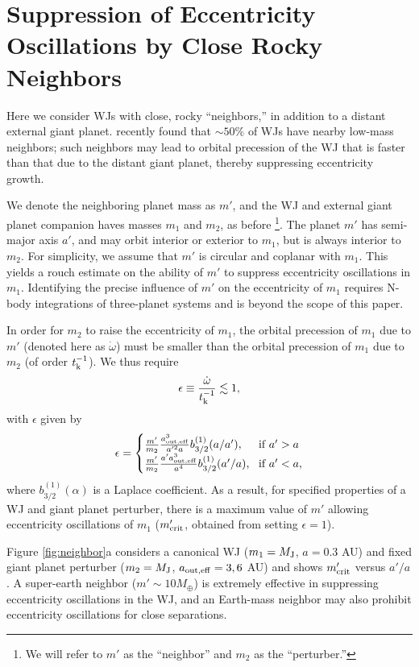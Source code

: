 \documentclass[12pt,useAMS, usenatbib]{mn2e}
\newcommand{\be}{\begin{equation}}
\newcommand{\ee}{\end{equation}}
\newcommand{\aouteff}{a_{\rm out,eff}}
\newcommand{\tk}{t_{\rm k}}
\newcommand{\mjup}{M_{\rm J}}
\begin{document}
\section{Suppression of Eccentricity Oscillations by Close Rocky Neighbors}
Here we consider WJs with close, rocky ``neighbors,'' in addition to a distant external giant planet.   \cite{huang2016} recently found that $\sim 50 \%$ of WJs have nearby low-mass neighbors; such neighbors may lead to orbital precession of the WJ that is faster than that due to the distant giant planet, thereby suppressing eccentricity growth.

We denote the neighboring planet mass as $m'$, and the WJ and external giant planet companion haves masses $m_1$ and $m_2$, as before \footnote{We will refer to $m'$ as the ``neighbor'' and $m_2$ as the ``perturber.''}.  The planet $m'$ has semi-major axis $a'$, and may orbit interior or exterior to $m_1$, but is always interior to $m_2$.  For simplicity, we assume that $m'$ is circular and coplanar with $m_1$.  This yields a rouch estimate on the ability of $m'$ to suppress eccentricity oscillations in $m_1$.  Identifying the precise influence of $m'$ on the eccentricity of $m_1$ requires N-body integrations of three-planet systems and is beyond the scope of this paper.

In order for $m_2$ to raise the eccentricity of $m_1$, the orbital precession of $m_1$ due to $m'$ (denoted here as $\dot{\omega}$) must be smaller than the orbital precession of $m_1$ due to $m_2$ (of order $\tk^{-1}$).  We thus require
\be
\epsilon \equiv \frac{\dot{\omega}}{\tk^{-1}} \lesssim 1,
\ee
with $\epsilon$ given by
\be
\epsilon = 
\begin{cases}
\frac{m'}{m_2}  \frac{\aouteff^3}{a'^2 a}  b_{3/2}^{(1)} ( a/a') , &  \! \text{if } a' > a \\    
\frac{m'}{m_2}  \frac{a' \aouteff^3}{a^4} b_{3/2}^{(1)} (a'/a) , & \! \text{if } a' < a,
\label{eq:neighbor}
\end{cases}
\ee
where $b_{3/2}^{(1)}(\alpha)$ is a Laplace coefficient.  As a result, for specified properties of a WJ and giant planet perturber, there is a maximum value of $m'$ allowing eccentricity oscillations of $m_1$ ($m_{\rm crit}'$, obtained from setting $\epsilon = 1$).

Figure \ref{fig:neighbor}a considers a canonical WJ ($m_1 = \mjup$, $a = 0.3$ AU) and fixed giant planet perturber ($m_2 = \mjup$, $\aouteff = 3, 6$ AU) and shows $m_{\rm crit}'$ versus $a'/a$.  A super-earth neighbor ($m' \sim 10 M_{\oplus}$) is extremely effective in suppressing eccentricity oscillations in the WJ, and an Earth-mass neighbor may also prohibit eccentricity oscillations for close separations.
\end{document}
